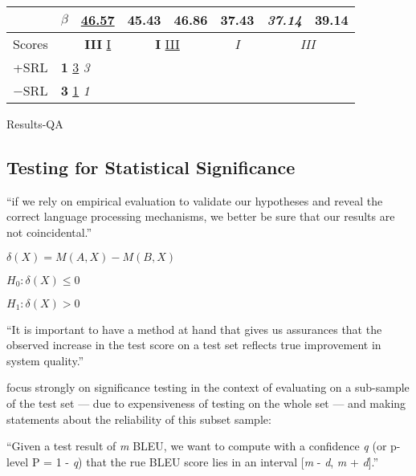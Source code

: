 {{\begin{tabular}{llccc|ccc}
      \multicolumn{1}{c}{}                       & $\beta$   & \multicolumn{1}{c|}{\underline{46.57}}          & \multicolumn{1}{c}{45.43}             & \multicolumn{1}{c|}{\textbf{46.86}}    & \multicolumn{1}{c|}{37.43}          & \multicolumn{1}{c}{\textit{37.14}} & \multicolumn{1}{c}{39.14}          \\ \hline\hline
      \multicolumn{1}{c}{Scores}                 &           & \multicolumn{1}{c|}{\textbf{III} \underline{I}} & \multicolumn{2}{c|}{\textbf{I} \underline{III}}                                & \multicolumn{1}{c|}{\textit{I}}     & \multicolumn{2}{c}{\textit{III}} \\ \cline{1-2}
      \multicolumn{1}{c}{+SRL}                   & \multicolumn{3}{l}{\textbf{1} \underline{3} \textit{3}} \\
      \multicolumn{1}{c}{$-$SRL}                 & \multicolumn{3}{l}{\textbf{3} \underline{1} \textit{1}}

      \end{tabular}
    }
  }{Results-QA}


\subsection{Testing for Statistical Significance}

``if we rely on empirical evaluation to validate our hypotheses and reveal the correct language processing mechanisms, we better be sure that our results are not coincidental.'' \citep{dror2018hitchhiker}


$\delta(X) = M(A, X) - M(B, X)$

$H_0:\delta(X) \leq 0$

$H_1:\delta(X) > 0$

``It is important to have a method at hand that gives us assurances that the
observed increase in the test score on a test set reflects true improvement in system
quality.'' \citep{koehn2004statistical}

\citet{koehn2004statistical} focus strongly on significance testing in the context of evaluating
on a sub-sample of the test set --- due to expensiveness of testing on the whole set ---
and making statements about the reliability of this subset sample:

``Given a test result of \emph{m} BLEU, we want to compute with a confidence \emph{q} (or
p-level P = 1 - \emph{q}) that the rue BLEU score lies in an interval [\emph{m} - \emph{d},
\emph{m} + \emph{d}].'' \citep{koehn2004statistical}

